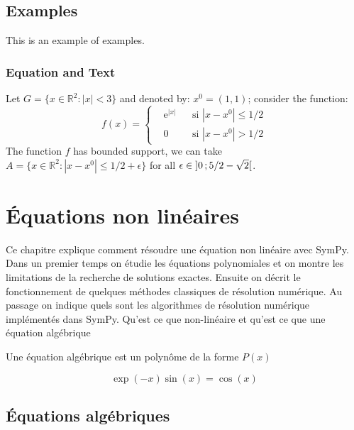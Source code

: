 \section{Examples}

This is an example of examples.

\subsection{Equation and Text}

\begin{example}
Let $G=\{x\in\mathbb{R}^2:|x|<3\}$ and denoted by: $x^0=(1,1)$; consider the function:
\begin{equation}
f(x)=\left\{\begin{aligned} & \mathrm{e}^{|x|} & & \text{si $|x-x^0|\leq 1/2$}\\
& 0 & & \text{si $|x-x^0|> 1/2$}\end{aligned}\right.
\end{equation}
The function $f$ has bounded support, we can take $A=\{x\in\mathbb{R}^2:|x-x^0|\leq 1/2+\epsilon\}$ for all $\epsilon\in\mathopen{]}0\,;5/2-\sqrt{2}\mathclose{[}$.
\end{example}

\chapter{Équations non linéaires}
Ce chapitre explique comment résoudre une équation non linéaire avec SymPy.
Dans un premier temps on étudie les équations polynomiales et on montre les
limitations de la recherche de solutions exactes. Ensuite on décrit le fonctionnement
de quelques méthodes classiques de résolution numérique. Au passage on indique
quels sont les algorithmes de résolution numérique implémentés dans SymPy.
Qu'est ce que non-linéaire et qu'est ce que une \'equation alg\'ebrique

Une \'equation alg\'ebrique est un polyn\^ome de la forme $P(x)$

\begin{equation}
\exp(-x)\sin(x) = \cos(x)
\end{equation}
\section{Équations algébriques}